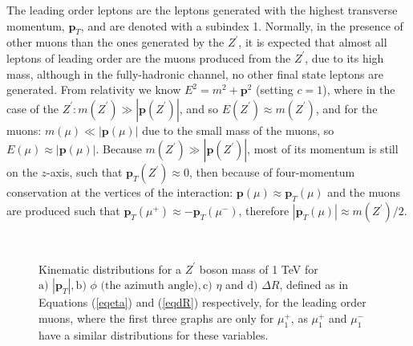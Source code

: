 The leading order leptons are the leptons generated with the highest transverse momentum, $\bm{p}_T$, and are denoted with a subindex 1. Normally, in the presence of other muons than the ones generated by the $Z^{\prime}$, it is expected that almost all leptons of leading order are the muons produced from the $Z^{\prime}$, due to its high mass, although in the fully-hadronic channel, no other final state leptons are generated. From relativity we know $E^2 = m^2 + \bm{p}^2$ (setting $c=1$), where in the case of the $Z^{\prime}: m(Z^{\prime}) \gg |\bm{p}(Z^{\prime})|$, and so $E(Z^{\prime}) \approx m(Z^{\prime})$, and for the muons: $m(\mu) \ll |\bm{p}(\mu)|$ due to the small mass of the muons, so $E(\mu) \approx |\bm{p}(\mu)|$. Because $m(Z^{\prime})\gg|\bm{p}(Z^{\prime})|$, most of its momentum is still on the $z$-axis, such that $\bm{p}_{T}(Z^{\prime})\approx 0$, then because of four-momentum conservation at the vertices of the interaction: $\bm{p}(\mu) \approx \bm{p}_{T}(\mu)$ and the muons are produced such that $\bm{p}_{T}(\mu^+) \approx -\bm{p}_{T}(\mu^-)$, therefore $|\bm{p}_{T}(\mu)| \approx m(Z^{\prime})/2$.


\begin{figure}[ht!]
     \begin{center}
        \\
    \end{center}
    \vspace{-1\baselineskip}
    \caption{ Kinematic distributions for a $Z^{\prime}$ boson mass of 1 TeV for $\textrm{a) }|\bm{p}_T|,\textrm{b) } \phi \textrm{ (the azimuth angle)},\textrm{c) } \eta$ and $\textrm{d) }\Delta R$, defined as in Equations (\ref{eqeta}) and (\ref{eqdR}) respectively, for the leading order muons, where the first three graphs are only for $\mu^+_1$, as $\mu^+_1$ and $\mu^-_1$ have a similar distributions for these variables.} 
   \label{preliminarygraphs1}
\end{figure}

